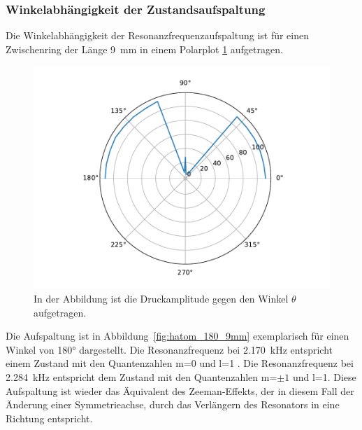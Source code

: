         \subsubsection*{Winkelabhängigkeit der Zustandsaufspaltung}
            Die Winkelabhängigkeit der Resonanzfrequenzaufspaltung ist für einen Zwischenring der Länge \SI{9}{\milli\metre} in einem Polarplot \ref{fig:H_atom_resonanz_4} aufgetragen.  
            \FloatBarrier 
            \begin{figure}[ht!]
                \centering
                \includegraphics[scale=0.5]{./pictures/H_atom_resonanz_4.pdf}
                \caption{In der Abbildung ist die Druckamplitude gegen den Winkel $\theta$ aufgetragen.}
                \label{fig:H_atom_resonanz_4}
            \end{figure}
            \FloatBarrier
            Die Aufspaltung ist in Abbildung~\ref{fig:hatom_180_9mm} exemplarisch für einen Winkel von 180° dargestellt. Die Resonanzfrequenz bei \SI{2.170}{\kilo\hertz} entspricht einem Zustand mit den 
            Quantenzahlen m=0 und l=1 . Die Resonanzfrequenz bei \SI{2.284}{\kilo\hertz} entspricht dem Zustand mit den Quantenzahlen m=$\pm 1$ und l=1. Diese Aufspaltung ist wieder das Äquivalent des
            Zeeman-Effekts, der in diesem Fall der Änderung einer Symmetrieachse, durch das Verlängern des Resonators in eine Richtung entspricht.
            \FloatBarrier

